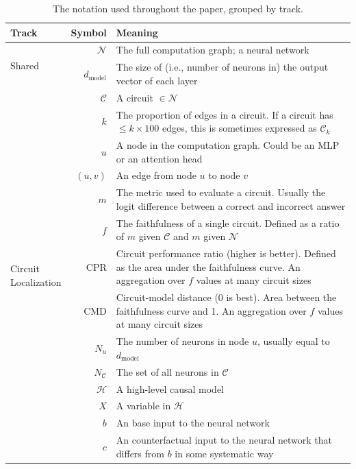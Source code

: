 \documentclass{article}
\theoremstyle{plain}
\theoremstyle{definition}
\theoremstyle{remark}
\newcommand{\arxiv}[1]{#1}
\begin{document}
\begin{table}
    \centering
    \caption{\arxiv{The notation used throughout the paper, grouped by track.}}
    \begin{tabular}{p{1.8cm}rp{10cm}}
    \toprule
    \textbf{Track} & \textbf{Symbol} & \textbf{Meaning} \\
    \midrule
    \multirow{2}{*}{Shared} & $\mathcal{N}$ & The full computation graph; a neural network \\
    & $d_\text{model}$ & The size of (i.e., number of neurons in) the output vector of each layer \\
    \midrule
    \multirow{15}{*}{\parbox{1.8cm}{Circuit\\ Localization}} &  $\mathcal{C}$ & A circuit $\in \mathcal{N}$ \\
    & $k$ & The proportion of edges in a circuit. If a circuit has $\leq k\times 100$ edges, this is sometimes expressed as $\mathcal{C}_k$ \\
    & $u$ & A node in the computation graph. Could be an MLP or an attention head \\ 
    & $(u,v)$ & An edge from node $u$ to node $v$ \\
    & $m$ & The metric used to evaluate a circuit. Usually the logit difference between a correct and incorrect answer \\
    & $f$ & The faithfulness of a single circuit. Defined as a ratio of $m$ given $\mathcal{C}$ and $m$ given $\mathcal{N}$ \\
    & \textsf{CPR} & Circuit performance ratio (higher is better). Defined as the area under the faithfulness curve. An aggregation over $f$ values at many circuit sizes \\
    & \textsf{CMD} & Circuit-model distance (0 is best). Area between the faithfulness curve and 1.  An aggregation over $f$ values at many circuit sizes \\
    & $N_u$ & The number of neurons in node $u$, usually equal to $d_\text{model}$ \\
    & $N_\mathcal{C}$ & The set of all neurons in $\mathcal{C}$ \\
    \midrule
    \multirow{10}{*}{\parbox{1.8cm}{Causal Variable Localization}} & $\mathcal{H}$ & A high-level causal model \\
    & $X$ & A variable in $\mathcal{H}$ \\
    & $b$ & An base input to the neural network \\
    & $c$ & An counterfactual input to the neural network that differs from $b$ in some systematic way \\

\end{tabular}
\end{table}
\end{document}
